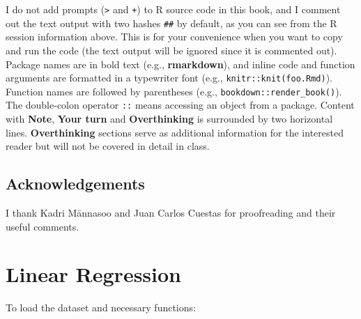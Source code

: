 \documentclass[]{book}
\begin{document}
I do not add prompts (\texttt{\textgreater{}} and \texttt{+}) to R
source code in this book, and I comment out the text output with two
hashes \texttt{\#\#} by default, as you can see from the R session
information above. This is for your convenience when you want to copy
and run the code (the text output will be ignored since it is commented
out). Package names are in bold text (e.g., \textbf{rmarkdown}), and
inline code and function arguments are formatted in a typewriter font
(e.g.,
\texttt{knitr::knit(\textquotesingle{}foo.Rmd\textquotesingle{})}).
Function names are followed by parentheses (e.g.,
\texttt{bookdown::render\_book()}). The double-colon operator
\texttt{::} means accessing an object from a package. Content with
\textbf{Note}, \textbf{Your turn} and \textbf{Overthinking} is
surrounded by two horizontal lines. \textbf{Overthinking} sections serve
as additional information for the interested reader but will not be
covered in detail in class.

\hypertarget{acknowledgements}{%
\section*{Acknowledgements}\label{acknowledgements}}

I thank Kadri Männasoo and Juan Carlos Cuestas for proofreading and
their useful comments.

\hypertarget{linearregression}{%
\chapter{Linear Regression}\label{linearregression}}

To load the dataset and necessary functions:
\end{document}
